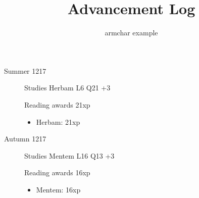 \documentclass{scrartcl}
\title{Advancement Log}
\author{armchar example}
\begin{document}
\maketitle
\begin{description}
  \item[Summer 1217]
    Studies Herbam L6 Q21 +3

    Reading awards 21xp
    \begin{itemize}
      \item Herbam: 21xp
    \end{itemize}
  \item[Autumn 1217]
    Studies Mentem L16 Q13 +3

    Reading awards 16xp
    \begin{itemize}
      \item Mentem: 16xp
    \end{itemize}
\end{description}
\end{document}
